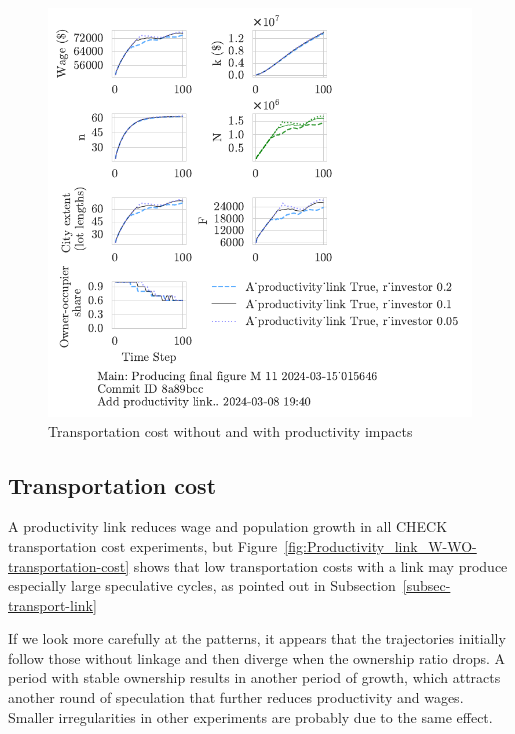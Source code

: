 {\begin{figure}[h!tb]
    \includegraphics[scale=.75, trim={0 1.4cm 3.5cm 0},clip]{fig/With-productivity_link-r_investor-15_015646.pdf} 
    \caption{Transportation cost without and with productivity impacts}
    \label{fig:Productivity_link_W-WO-Cost-of-capital}
\end{figure}

\newpage
\subsection{Transportation cost}\label{subsec-transport-pair}

A productivity link reduces wage and population growth in all {\color{red}CHECK  transportation cost} experiments,  but Figure~\ref{fig:Productivity_link_W-WO-transportation-cost} shows that low transportation costs with a link may produce especially large speculative cycles, as pointed out in Subsection~\ref{subsec-transport-link} 

If we look more carefully at the patterns, it appears that the trajectories initially follow those without linkage and then diverge when the ownership ratio drops. A period with stable ownership results in another period of growth, which attracts another round of speculation that further reduces productivity and wages. Smaller irregularities in other experiments are probably due to the same effect.

}
